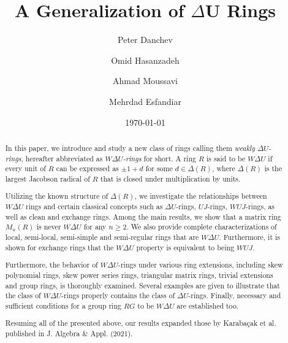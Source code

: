 \documentclass[12pt]{amsart}
\theoremstyle{definition}
\begin{document}
	
\author[P. Danchev]{Peter Danchev}
\address{Institute of Mathematics and Informatics, Bulgarian Academy of Sciences, 1113 Sofia, Bulgaria}
	
\author[O. Hasanzadeh]{Omid Hasanzadeh}
\address{Department of Mathematics, Tarbiat Modares University, 14115-111 Tehran Jalal AleAhmad Nasr, Iran}

\author[A. Moussavi]{Ahmad Moussavi}
\address{Department of Mathematics, Tarbiat Modares University, 14115-111 Tehran Jalal AleAhmad Nasr, Iran}

\author[M. Esfandiar]{Mehrdad Esfandiar}
\address{Department of Mathematics and Computer Science Shahed University Tehran, Iran}

\title[Weakly $\Delta$U Rings]{A Generalization of $\Delta$U Rings}

\maketitle

\date{\today}

\begin{abstract}
In this paper, we introduce and study a new class of rings calling them {\it weakly $\Delta U$-rings}, hereafter abbreviated as {\it $W\Delta U$-rings} for short. A ring $R$ is said to be $W\Delta U$ if every unit of $R$ can be expressed as $\pm 1 + d$ for some $d \in \Delta(R)$, where $\Delta(R)$ is the largest Jacobson radical of $R$ that is closed under multiplication by units.

Utilizing the known structure of $\Delta(R)$, we investigate the relationships between $W\Delta U$ rings and certain classical concepts such as $\Delta U$-rings, $UJ$-rings, $WUJ$-rings, as well as clean and exchange rings. Among the main results, we show that a matrix ring $M_n(R)$ is never $W\Delta U$ for any $n \ge 2$. We also provide complete characterizations of local, semi-local, semi-simple and semi-regular rings that are $W\Delta U$. Furthermore, it is shown for exchange rings that the $W\Delta U$ property is equivalent to being $WUJ$.

Furthermore, the behavior of $W\Delta U$-rings under various ring extensions, including skew polynomial rings, skew power series rings, triangular matrix rings, trivial extensions and group rings, is thoroughly examined. Several examples are given to illustrate that the class of $W\Delta U$-rings properly contains the class of $\Delta U$-rings. Finally, necessary and sufficient conditions for a group ring $RG$ to be $W\Delta U$ are established too.	

Resuming all of the presented above, our results expanded those by Karaba\c{c}ak et al. published in J. Algebra \& Appl. (2021).
\end{abstract}
\end{document}
